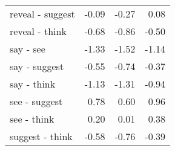 \begin{longtable}{lrrr}
  reveal - suggest & -0.09 & -0.27 & 0.08 \\ 
  reveal - think & -0.68 & -0.86 & -0.50 \\ 
  say - see & -1.33 & -1.52 & -1.14 \\ 
  say - suggest & -0.55 & -0.74 & -0.37 \\ 
  say - think & -1.13 & -1.31 & -0.94 \\ 
  see - suggest & 0.78 & 0.60 & 0.96 \\ 
  see - think & 0.20 & 0.01 & 0.38 \\ 
  suggest - think & -0.58 & -0.76 & -0.39 \\ 
  \end{longtable}

